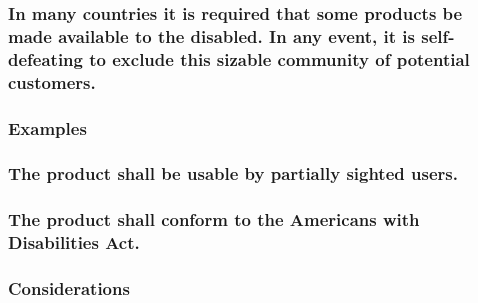\documentclass[
]{article}
\begin{document}
\hypertarget{in-many-countries-it-is-required-that-some-products-be-made-available-to-the-disabled.-in-any-event-it-is-self-defeating-to-exclude-this-sizable-community-of-potential-customers.}{%
\subsubsection{\texorpdfstring{In many countries it is required that
some products be made available to the disabled. In any event, it is
self-defeating to exclude this sizable community of potential customers.
}{In many countries it is required that some products be made available to the disabled. In any event, it is self-defeating to exclude this sizable community of potential customers. }}\label{in-many-countries-it-is-required-that-some-products-be-made-available-to-the-disabled.-in-any-event-it-is-self-defeating-to-exclude-this-sizable-community-of-potential-customers.}}

\hypertarget{examples-20}{%
\subsubsection{Examples}\label{examples-20}}

\hypertarget{the-product-shall-be-usable-by-partially-sighted-users.}{%
\subsubsection{The product shall be usable by partially sighted
users.}\label{the-product-shall-be-usable-by-partially-sighted-users.}}

\hypertarget{the-product-shall-conform-to-the-americans-with-disabilities-act.}{%
\subsubsection{\texorpdfstring{The product shall conform to the
Americans with Disabilities Act.
}{The product shall conform to the Americans with Disabilities Act. }}\label{the-product-shall-conform-to-the-americans-with-disabilities-act.}}

\hypertarget{considerations-24}{%
\subsubsection{Considerations}\label{considerations-24}}
\end{document}
